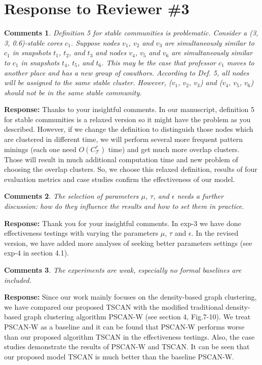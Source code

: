\documentclass{article}
\newtheorem{Comments}{\textbf{Comments}}
\begin{document}
\section{Response to Reviewer \#3 }
\setcounter{Comments}{0}
\begin{Comments}
Definition 5 for stable communities is problematic. Consider a (3, 3, 0.6)-stable cores $c_1$. Suppose nodes $v_1$, $v_2$ and $v_3$ are simultaneously similar to $c_1$ in snapshots $t_1$, $t_2$, and $t_3$ and nodes $v_4$, $v_5$ and $v_6$ are simultaneously similar to $c_1$ in snapshots $t_4$, $t_5$, and $t_6$. This may be the case that professor $c_1$ moves to another place and has a new group of coauthors. According to Def. 5, all nodes will be assigned to the same stable cluster. However, ($v_1$, $v_2$, $v_3$) and ($v_4$, $v_5$, $v_6$) should not be in the same stable community.

\end{Comments}
\noindent \textbf{Response: } Thanks to your insightful comments. In our manuscript, definition 5 for stable communities is a relaxed version so it might have the problem as you described. However, if we change the definition to distinguish those nodes which are clustered in different time, we will perform several more frequent pattern minings (each one need $O(C_{\mathcal{T}}^\tau)$ time) and get much more overlap clusters. Those will result in much additional computation time and new problem of choosing the overlap clusters. So, we choose this relaxed definition, results of four evaluation metrics and case studies confirm the effectiveness of our model.

\begin{Comments}
The selection of parameters $\mu$, $\tau$, and $\epsilon$ needs a further discussion: how do they influence the results and how to set them in practice.
\end{Comments}
\noindent \textbf{Response: } Thank you for your insightful comments. In exp-3 we have done effectiveness testings with varying the parameters $\mu$, $\tau$ and $\epsilon$. In the revised version, we have added more analyses of seeking better parameters settings (see exp-4 in section 4.1).

\begin{Comments}
	The experiments are weak, especially no formal baselines are included.
\end{Comments}
\noindent \textbf{Response: } Since our work mainly focuses on the density-based graph clustering, we have compared our proposed TSCAN with the modified traditional density-based graph clustering algorithm PSCAN-W (see section 4, Fig.7-10). We treat PSCAN-W as a baseline and it can be found that PSCAN-W performs worse than our proposed algorithm TSCAN in the effectiveness testings. Also, the case studies demonstrate the results of PSCAN-W and TSCAN. It can be seen that our proposed model TSCAN is much better than the baseline PSCAN-W. 
\end{document}
